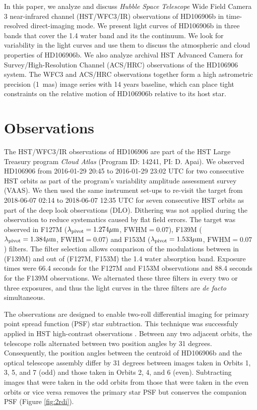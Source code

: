 \documentclass[twocolumn]{aastex62}
\begin{document}
In this paper, we analyze and discuss \emph{Hubble Space Telescope} Wide Field Camera 3 near-infrared channel (HST/WFC3/IR) observations of HD106906b in time-resolved direct-imaging mode. We present light curves of HD106906b in three bands that cover the 1.4\micron{} water band and its the continuum. We look for variability in the light curves and use them to discuss the atmospheric and cloud properties of HD106906b. We also analyze archival HST Advanced Camera for Survey/High-Resolution Channel (ACS/HRC) observations of the HD106906 system. The WFC3 and ACS/HRC observations together form a high astrometric precision (1~mas) image series with 14 years baseline,  which can place tight constraints on the relative motion of HD106906b relative to its host star.

\section{Observations}
The HST/WFC3/IR observations of HD106906 are part of the HST Large Treasury program \emph{Cloud Atlas} (Program ID: 14241, PI: D. Apai). We observed HD106906 from 2016-01-29 20:45 to 2016-01-29 23:02 UTC for two consecutive HST orbits as part of the program's variability amplitude assessment survey (VAAS). We then used the same instrument set-ups to re-visit the target from 2018-06-07 02:14 to 2018-06-07 12:35 UTC  for seven consecutive HST orbits as part of the deep look observations (DLO). Dithering was not applied during the observation to reduce systematics caused by flat field errors. The target was observed in F127M ($\lambda_{\mathrm{pivot}}=1.274\mbox{$\mu$m}$, $\mathrm{FWHM}=0.07$), F139M ($\lambda_{\mathrm{pivot}}=1.384\mbox{$\mu$m}$, $\mathrm{FWHM}=0.07$) and F153M ($\lambda_{\mathrm{pivot}}=1.533\mbox{$\mu$m}$, $\mathrm{FWHM}=0.07$) filters.  The filter selection allows comparison of the modulations between in (F139M) and out of (F127M, F153M) the 1.4 \micron{} water absorption band.  Exposure times were 66.4 seconds for the F127M and F153M observations and 88.4 seconds for the F139M observations. We alternated these three filters in every two or three exposures, and thus the light curves in the three filters are \emph{de facto} simultaneous. 

The observations are designed to enable two-roll differential imaging for primary point spread function (PSF) star subtraction.  This technique was successfuly applied in HST high-contrast observations \citep{Zhou2016,Zhou2019}. Between any two adjacent orbits, the telescope rolls alternated between two position angles by 31 degrees.  Consequently, the position angles between the centroid of HD106906b and the optical telescope assembly differ by 31 degrees between images taken in Orbits 1, 3, 5, and 7 (odd) and those taken in Orbits 2, 4, and 6 (even). Subtracting images that were taken in the odd orbits from those that were taken in the even orbits or vice versa removes the primary star PSF but conserves the companion PSF (Figure \ref{fig:2rdi}).  
\end{document}
